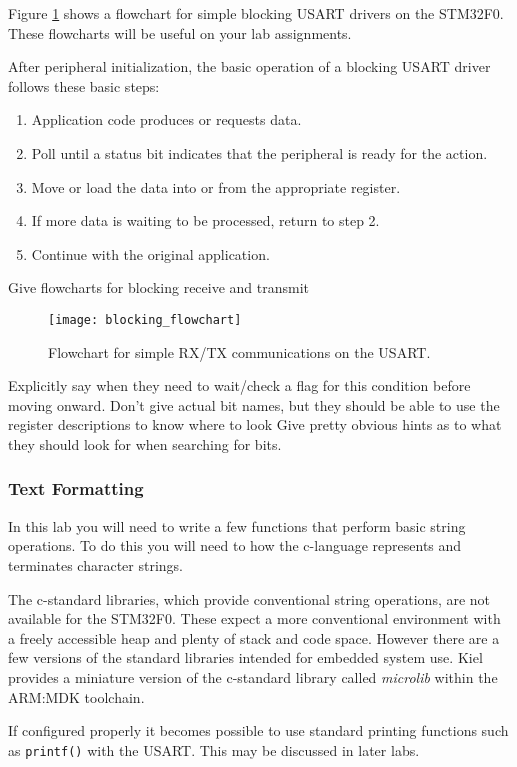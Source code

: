 \documentclass[11pt,fleqn]{book} %
\begin{document}
Figure \ref{blocking_flowchart} shows a flowchart for simple blocking USART drivers on the STM32F0. These flowcharts will be useful on your lab assignments. 

After peripheral initialization, the basic operation of a blocking USART driver follows these basic steps:
\begin{enumerate}
    \item Application code produces or requests data.
    \item Poll until a status bit indicates that the peripheral is ready for the action.
    \item Move or load the data into or from the appropriate register.
    \item If more data is waiting to be processed, return to step 2.
    \item Continue with the original application.
\end{enumerate}



Give flowcharts for blocking receive and transmit
\begin{figure}[]
    \centering\texttt{[image: blocking\_flowchart]}
    \caption{Flowchart for simple RX/TX communications on the USART.}
    \label{blocking_flowchart}
\end{figure}
Explicitly say when they need to wait/check a flag for this condition before moving onward. 
Don't give actual bit names, but they should be able to use the register descriptions to know where to look
Give pretty obvious hints as to what they should look for when searching for bits.
\subsubsection{Text Formatting}
In this lab you will need to write a few functions that perform basic string operations. To do this you will need to how the c-language represents and terminates character strings. 

The c-standard libraries, which provide conventional string operations, are not available for the STM32F0. These expect a more conventional environment with a freely accessible heap and plenty of stack and code space. However there are a few versions of the standard libraries intended for embedded system use. Kiel provides a miniature version of the c-standard library called \textit{microlib} within the ARM:MDK toolchain.

If configured properly it becomes possible to use standard printing functions such as \texttt{printf()} with the USART. This may be discussed in later labs. 
\end{document}

